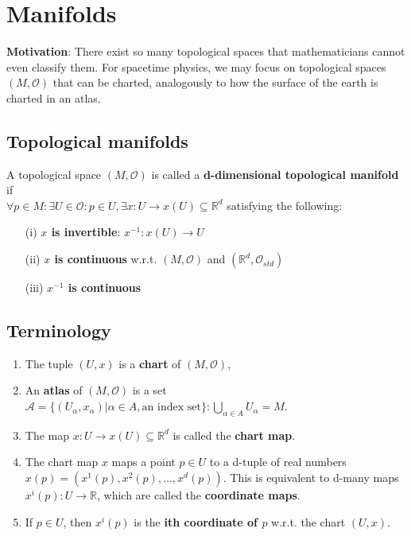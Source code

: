 \section{Manifolds}

\begin{framed}
\textbf{Motivation}: There exist so many topological spaces that mathematicians cannot even classify them. For spacetime physics, we may focus on topological spaces $(M, \mathcal{O})$ that can be charted, analogously to how the surface of the earth is charted in an atlas.
\end{framed}

\subsection{Topological manifolds}
\begin{definition}
  A topological space $(M, \mathcal{O})$ is called a \textbf{d-dimensional topological manifold} if \\
  $\forall p \in M : \exists U \in \mathcal{O} : p \in U, \exists x : U \to x(U) \subseteq \mathbb{R}^d$ satisfying the following:
\begin{enumerate}
\item[(i)] \textbf{$x$ is invertible}: $x^{-1} : x(U) \to U$
\item[(ii)] \textbf{$x$ is continuous} w.r.t. $(M, \mathcal{O})$ and $(\mathbb{R}^d, \mathcal{O}_{std})$
\item[(iii)] \textbf{$x^{-1}$ is continuous}
\end{enumerate}
\end{definition}

\subsection{Terminology}
\begin{enumerate}
\item The tuple $(U , x)$ is a \textbf{chart} of $(M, \mathcal{O})$,
\item An \textbf{atlas} of $(M, \mathcal{O})$ is a set $\mathcal{A} = \lbrace (U_{\alpha}, x_{\alpha}) | \alpha \in A, \text{an index set} \rbrace : \bigcup_{\alpha \in A}U_{\alpha} = M$.
\item The map $x : U \to x(U) \subseteq \mathbb{R}^d$ is called the \textbf{chart map}.
\item The chart map $x$ maps a point $ p \in U$ to a d-tuple of real numbers $x(p) = (x^1(p), x^2(p), \dots , x^d(p))$. This is equivalent to d-many maps $x^i(p): U \to \mathbb{R}$, which are called the \textbf{coordinate maps}. 
\item If $p \in U$, then $x^i(p)$ is the \textbf{ith coordinate of $p$} w.r.t. the chart $(U, x)$.
\end{enumerate}

